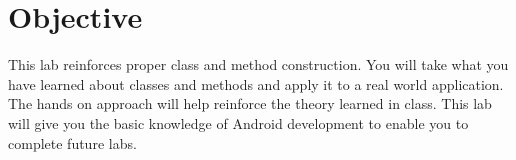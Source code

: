 \section{Objective}

This lab reinforces proper class and method construction.
You will take what you have learned about classes and methods and apply it to a real world application.
The hands on approach will help reinforce the theory learned in class.
This lab will give you the basic knowledge of Android development to enable you to complete future labs.
